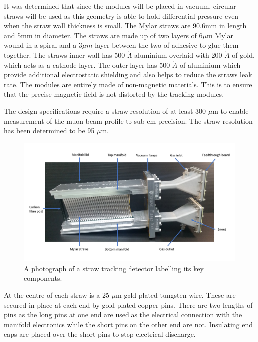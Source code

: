 It was determined that since the modules will be placed in vacuum, circular straws will be used as this geometry is able to hold differential pressure even when the straw wall thickness is small. The Mylar straws are 90.6mm in length and 5mm in diameter. The straws are made up of two layers of 6${\mu}$m Mylar wound in a spiral and a 3$\mu{m}$ layer between the two of adhesive to glue them together. The straws inner wall has 500 $\mathring{A}$ aluminium overlaid with 200 $\mathring{A}$ of gold, which acts as a cathode layer. The outer layer has 500 $\mathring{A}$ of aluminium which provide additional electrostatic shielding and also helps to reduce the straws leak rate\cite{Reference29}. The modules are entirely made of non-magnetic materials. This is to ensure that the precise magnetic field is not distorted by the tracking modules. 

The design specifications require a straw resolution of at least 300 $\mu$m to enable measurement of the muon beam profile to sub-cm precision. The straw resolution has been determined to be 95 $\mu$m.

\begin{figure}[th]
\centering
\includegraphics[scale=0.40]{Figures/labeledstrawtracker.pdf}
\decoRule
\caption{A photograph of a straw tracking detector labelling its key components.}
\label{fig:labeledstrawtracker}
\end{figure}

At the centre of each straw is a 25 $\mu$m gold plated tungsten wire. These are secured in place at each end by gold plated copper pins. There are two lengths of pins as the long pins at one end are used as the electrical connection with the manifold electronics while the short pins on the other end are not. Insulating end caps are placed over the short pins to stop electrical discharge.


